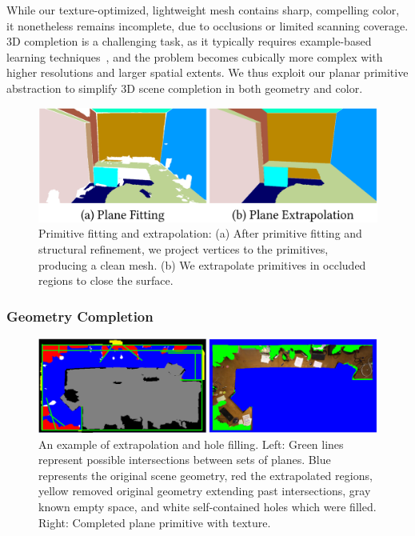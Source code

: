 While our texture-optimized, lightweight mesh contains sharp, compelling color, it nonetheless remains incomplete, due to occlusions or limited scanning coverage.
3D completion is a challenging task, as it typically requires example-based learning techniques~\cite{dai2017complete}, and the problem becomes cubically more complex with  higher resolutions and larger spatial extents.
We thus exploit our planar primitive abstraction to simplify 3D scene completion in both geometry and color.%
\begin{figure}
	\centering
    \includegraphics[width=0.8\linewidth]{3dlite/fig7.png}
	\caption{Primitive fitting and extrapolation: (a) After primitive fitting and structural refinement, we project vertices to the primitives, producing a clean mesh. (b) We extrapolate primitives in occluded regions to close the surface.}
	\label{fig:3dlite-plane-fit}
\end{figure}

\subsubsection{Geometry Completion}
\label{subsec:3dlite-extrapolate}
\begin{figure}
	\centering
	\includegraphics[width=0.8\linewidth]{3dlite/fig9.png}
	\caption{An example of extrapolation and hole filling. Left: Green lines represent possible intersections between sets of planes. Blue represents the original scene geometry, red the extrapolated regions, yellow removed original geometry extending past intersections, gray known empty space, and white self-contained holes which were filled. Right: Completed plane primitive with texture.}
	\label{fig:3dlite-plane-fill}
\end{figure}

